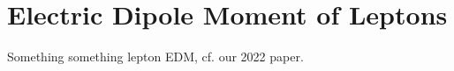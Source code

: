 \chapter{Electric Dipole Moment of Leptons}
\label{ch:leptonEDM}
Something something lepton EDM, cf. our 2022 paper.